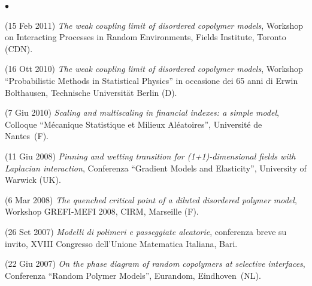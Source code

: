 \documentclass[a4paper,11pt,oneside]{amsart}
\newenvironment{myitemize}{%
\begin{list}{$\bullet$}%
 	{%
	\setlength{\itemsep}{0.3em}%
	\setlength{\topsep}{0.3em}%
	\setlength{\partopsep}{0em}%
	\setlength{\parsep}{0em}%
	\setlength{\parskip}{0em}%
	\setlength\leftmargin{1.5em}%
	\setlength\labelwidth{1.1em}%
	\setlength{\labelsep}{0.4em}%
	}%
	}%
{\end{list}}
\renewenvironment{itemize}{
\begin{myitemize}}%
{\end{myitemize}}
\begin{document}
\begin{itemize}
%
%
\item (15 Feb 2011)
\emph{The weak coupling limit of disordered copolymer models},
Workshop on Interacting Processes in Random Environments,
Fields Institute, Toronto (CDN).

\item (16 Ott 2010)
\emph{The weak coupling limit of disordered copolymer models},
Workshop ``Probabilistic Methods in Statistical Physics''
in occasione dei 65 anni di Erwin Bolthausen, Technische Universit\"at Berlin (D).


\item (7 Giu 2010)
\emph{Scaling and multiscaling in financial indexes: a simple model},
Colloque ``Mécanique Statistique et Milieux Aléatoires'',
Université de Nantes~(F).

\item (11 Giu 2008)
\textit{Pinning and wetting transition for
(1+1)-dimensional fields with Laplacian interaction},
Conferenza ``Gradient Models and Elasticity'', University of Warwick (UK).

\item (6 Mar 2008)
\textit{The quenched critical point of a diluted disordered polymer model}, 
Workshop GREFI-MEFI 2008, CIRM, Marseille (F).

\item (26 Set 2007)
\textit{Modelli di polimeri e passeggiate aleatorie},
conferenza breve su invito,
XVIII Congresso dell'Unione Matematica Italiana, Bari.

\item (22 Giu 2007)
\textit{On the phase diagram of random copolymers at selective interfaces},
Conferenza ``Random Polymer Models'', Eurandom, Eindhoven~(NL).


\end{itemize}
\end{document}
